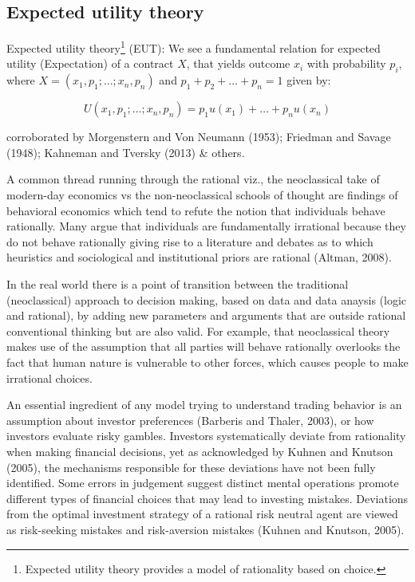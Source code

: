 \documentclass[]{DissertateUSU}
\let\rmarkdownfootnote\footnote%
\def\footnote{\protect\rmarkdownfootnote}
\begin{document}
\subsection{Expected utility theory}
\label{ssec:Expected utility theory}

Expected utility
theory\footnote{Expected utility theory provides a model of rationality based on choice.}
(EUT): We see a fundamental relation for expected utility (Expectation)
of a contract \(X\), that yields outcome \(x_i\) with probability
\(p_i\), where \(X = (x_1,p_1; ...; x_n,p_n)\) and
\(p_1+p_2+\ldots+p_n=1\) given by:

\singlespacing

\begin{equation}\label{EUT_extended}
U(x_1,p_1;\ldots;x_n,p_n) = p_1u(x_1)+\ldots+p_nu(x_n) 
\end{equation}

\doublespacing
corroborated by Morgenstern and Von Neumann (1953); Friedman and Savage
(1948); Kahneman and Tversky (2013) \& others.

A common thread running through the rational viz., the neoclassical take
of modern-day economics vs the non-neoclassical schools of thought are
findings of behavioral economics which tend to refute the notion that
individuals behave rationally. Many argue that individuals are
fundamentally irrational because they do not behave rationally giving
rise to a literature and debates as to which heuristics and sociological
and institutional priors are rational (Altman, 2008).\medskip

In the real world there is a point of transition between the traditional
(neoclassical) approach to decision making, based on data and data
anaysis (logic and rational), by adding new parameters and arguments
that are outside rational conventional thinking but are also valid. For
example, that neoclassical theory makes use of the assumption that all
parties will behave rationally overlooks the fact that human nature is
vulnerable to other forces, which causes people to make irrational
choices.\medskip 

An essential ingredient of any model trying to understand trading
behavior is an assumption about investor preferences (Barberis and
Thaler, 2003), or how investors evaluate risky gambles. Investors
systematically deviate from rationality when making financial decisions,
yet as acknowledged by Kuhnen and Knutson (2005), the mechanisms
responsible for these deviations have not been fully identified. Some
errors in judgement suggest distinct mental operations promote different
types of financial choices that may lead to investing mistakes.
Deviations from the optimal investment strategy of a rational risk
neutral agent are viewed as risk-seeking mistakes and risk-aversion
mistakes (Kuhnen and Knutson, 2005).\medskip 
\end{document}
